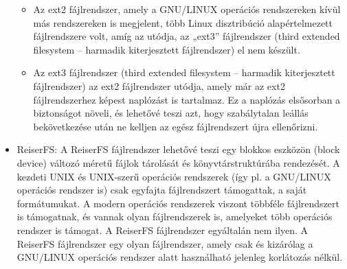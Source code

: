 \documentclass[margin=0px]{article}
\begin{document}
\begin{itemize}
\begin{itemize}
              \item Az ext2 fájlrendszer, amely a GNU/LINUX operációs rendszereken kívül más rendszereken is megjelent, több Linux disztribúció alapértelmezett fájlrendszere volt, amíg az utódja, az „ext3” fájlrendszer (third extended filesystem – harmadik kiterjesztett fájlrendszer) el nem készült.
              \item Az ext3 fájlrendszer (third extended filesystem – harmadik kiterjesztett fájlrendszer) az ext2 fájlrendszer utódja, amely már az ext2 fájlrendszerhez képest naplózást is tartalmaz. Ez a naplózás elsősorban a biztonságot növeli, és lehetővé teszi azt, hogy szabálytalan leállás bekövetkezése után ne kelljen az egész fájlrendszert újra ellenőrizni.
          \end{itemize}
    \item ReiserFS: A ReiserFS fájlrendszer lehetővé teszi egy blokkos eszközön (block device) változó méretű fájlok tárolását és könyvtárstruktúrába rendezését. A kezdeti UNIX és UNIX-szerű operációs rendszerek (így pl. a GNU/LINUX operációs rendszer is) csak egyfajta fájlrendszert támogattak, a saját formátumukat. A modern operációs rendszerek viszont többféle fájlrendszert is támogatnak, és vannak olyan fájlrendszerek is, amelyeket több operációs rendszer is támogat. A ReiserFS fájlrendszer egyáltalán nem ilyen. A ReiserFS fájlrendszer egy olyan fájlrendszer, amely csak és kizárólag a GNU/LINUX operációs rendszer alatt használható jelenleg korlátozás nélkül.
\end{itemize}
\end{document}
